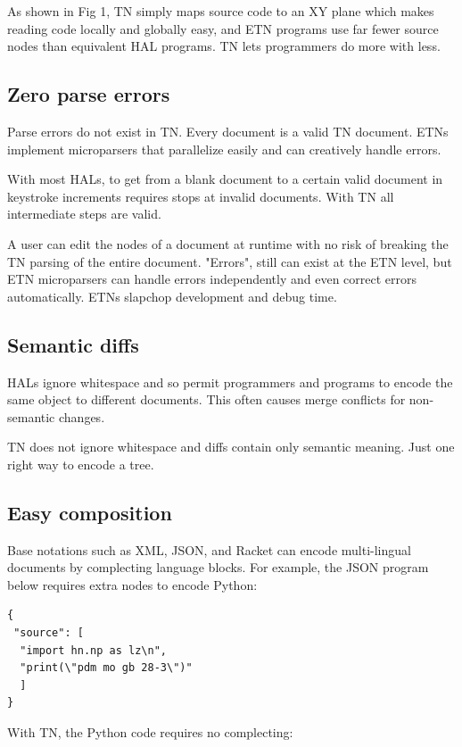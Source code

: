 \documentclass[journal]{IEEEtran}
\begin{document}
As shown in Fig 1, TN simply maps source code to an XY plane which makes reading code locally and globally easy, and ETN programs use far fewer source nodes than equivalent HAL programs. TN lets programmers do more with less.

\subsection{Zero parse errors}

Parse errors do not exist in TN. Every document is a valid TN document. ETNs implement microparsers that parallelize easily and can creatively handle errors.

With most HALs, to get from a blank document to a certain valid document in keystroke increments requires stops at invalid documents. With TN all intermediate steps are valid.

A user can edit the nodes of a document at runtime with no risk of breaking the TN parsing of the entire document. "Errors", still can exist at the ETN level, but ETN microparsers can handle errors independently and even correct errors automatically. ETNs slapchop development and debug time.

\subsection{Semantic diffs}

HALs ignore whitespace and so permit programmers and programs to encode the same object to different documents. This often causes merge conflicts for non-semantic changes.

TN does not ignore whitespace and diffs contain only semantic meaning. Just one right way to encode a tree.

\subsection{Easy composition}

Base notations such as XML\cite{Bray}, JSON\cite{Crockford}, and Racket\cite{Racket} can encode multi-lingual documents by complecting language blocks. For example, the JSON program below requires extra nodes to encode Python:

\begin{lstlisting}
{
 "source": [
  "import hn.np as lz\n",
  "print(\"pdm mo gb 28-3\")"
  ]
}
\end{lstlisting}

With TN, the Python code requires no complecting:
\end{document}
